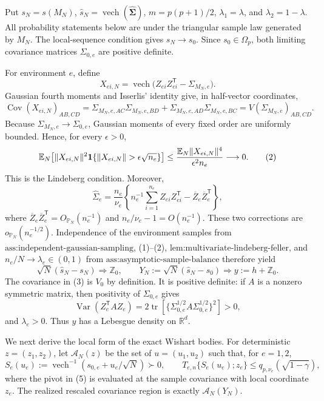 Put \(s_N=s(M_N)\), \(\widehat s_N=\operatorname{vech}(\widehat{\boldsymbol\Sigma})\), \(m=p(p+1)/2\), \(\lambda_1=\lambda\), and \(\lambda_2=1-\lambda\).  All probability statements below are under the triangular sample law generated by \(M_N\).  The local-sequence condition gives \(s_N\to s_0\).  Since \(s_0\in\Omega_p\), both limiting covariance matrices \(\Sigma_{0,e}\) are positive definite.

For environment \(e\), define
\[
 X_{ei,N}=\operatorname{vech}
 \bigl(Z_{ei}Z_{ei}^{\mathsf T}-\Sigma_{M_N,e}\bigr).
\]
Gaussian fourth moments and Isserlis' identity give, in half-vector coordinates,
\[
 \operatorname{Cov}(X_{ei,N})_{AB,CD}
 =\Sigma_{M_N,e,AC}\Sigma_{M_N,e,BD}
  +\Sigma_{M_N,e,AD}\Sigma_{M_N,e,BC}
 =V(\Sigma_{M_N,e})_{AB,CD}.
 \tag{1}
\]
Because \(\Sigma_{M_N,e}\to\Sigma_{0,e}\), Gaussian moments of every fixed order are uniformly bounded.  Hence, for every \(\epsilon>0\),
\[
 \mathbb E_N\!\left[
 \|X_{ei,N}\|^2
 {\bf1}\{\|X_{ei,N}\|>\epsilon\sqrt{n_e}\}
 \right]
 \le
 \frac{\mathbb E_N\|X_{ei,N}\|^4}{\epsilon^2n_e}
 \longrightarrow0.
 \tag{2}
\]
This is the Lindeberg condition.  Moreover,
\[
 \widehat\Sigma_e
 =\frac{n_e}{\nu_e}
 \left\{n_e^{-1}\sum_{i=1}^{n_e}Z_{ei}Z_{ei}^{\mathsf T}
       -\overline Z_e\overline Z_e^{\mathsf T}\right\},
\]
where \(\overline Z_e\overline Z_e^{\mathsf T}=O_{\mathbb P_N}(n_e^{-1})\) and \(n_e/\nu_e-1=O(n_e^{-1})\).  These two corrections are \(o_{\mathbb P_N}(n_e^{-1/2})\).  Independence of the environment samples from \(\text{ass:independent-gaussian-sampling}\), (1)--(2), \(\text{lem:multivariate-lindeberg-feller}\), and \(n_e/N\to\lambda_e\in(0,1)\) from \(\text{ass:asymptotic-sample-balance}\) therefore yield
\[
 \sqrt N(\widehat s_N-s_N)\Rightarrow\mathbb Z_0,
 \qquad
 Y_N:=\sqrt N(\widehat s_N-s_0)
 \Rightarrow y:=h+\mathbb Z_0.
 \tag{3}
\]
The covariance in (3) is \(V_0\) by definition.  It is positive definite: if \(A\) is a nonzero symmetric matrix, then positivity of \(\Sigma_{0,e}\) gives
\[
 \operatorname{Var}(Z_e^{\mathsf T}AZ_e)
 =2\operatorname{tr}\!\left[
   \{\Sigma_{0,e}^{1/2}A\Sigma_{0,e}^{1/2}\}^2
 \right]>0,
 \tag{4}
\]
and \(\lambda_e>0\).  Thus \(y\) has a Lebesgue density on \(\mathbb R^d\).

We next derive the local form of the exact Wishart bodies.  For deterministic \(z=(z_1,z_2)\), let \(\mathcal A_N(z)\) be the set of \(u=(u_1,u_2)\) such that, for \(e=1,2\),
\[
 S_e(u_e):=\operatorname{vech}^{-1}(s_{0,e}+u_e/\sqrt N)\succ0,
 \qquad
 T_{e,n}\{S_e(u_e);z_e\}
 \le q_{p,\nu_e}(\sqrt{1-\gamma}),
 \tag{5}
\]
where the pivot in (5) is evaluated at the sample covariance with local coordinate \(z_e\).  The realized rescaled covariance region is exactly \(\mathcal A_N(Y_N)\).

